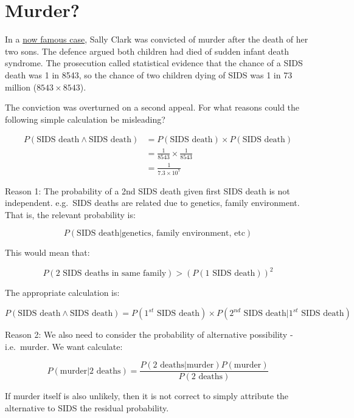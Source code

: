 \documentclass[
  letterpaper,
  DIV=11,
  numbers=noendperiod]{scrreprt}
\begin{document}
\hypertarget{murder}{%
\section{Murder?}\label{murder}}

In a \href{https://en.wikipedia.org/wiki/Sally_Clark}{now famous case},
Sally Clark was convicted of murder after the death of her two sons. The
defence argued both children had died of sudden infant death syndrome.
The prosecution called statistical evidence that the chance of a SIDS
death was 1 in 8543, so the chance of two children dying of SIDS was 1
in 73 million (\(8543\times 8543\)).

The conviction was overturned on a second appeal. For what reasons could
the following simple calculation be misleading?

\begin{align*}
P(\text{SIDS death}\land\text{SIDS death})&=P(\text{SIDS death})\times P(\text{SIDS death}) \\
&=\frac{1}{8543}\times\frac{1}{8543} \\
&=\frac{1}{\ensuremath{7.3\times 10^{7}}}
\end{align*}

\begin{tcolorbox}[enhanced jigsaw, title=\textcolor{quarto-callout-tip-color}{\faLightbulb}\hspace{0.5em}{Answer}, toprule=.15mm, colback=white, breakable, titlerule=0mm, colframe=quarto-callout-tip-color-frame, coltitle=black, opacityback=0, rightrule=.15mm, colbacktitle=quarto-callout-tip-color!10!white, bottomtitle=1mm, opacitybacktitle=0.6, arc=.35mm, bottomrule=.15mm, toptitle=1mm, leftrule=.75mm, left=2mm]

Reason 1: The probability of a 2nd SIDS death given first SIDS death is
not independent. e.g.~SIDS deaths are related due to genetics, family
environment. That is, the relevant probability is:

\[
P(\text{SIDS death}|\text{genetics, family environment, etc})
\]

This would mean that:

\[
P(\text{2 SIDS deaths in same family})>(P(\text{1 SIDS death}))^2
\]

The appropriate calculation is:

\[
P(\text{SIDS death}\land\text{SIDS death})=P(1^{st}\text{ SIDS death})\times P(2^{nd}\text{ SIDS death}|1^{st}\text{ SIDS death})
\]

Reason 2: We also need to consider the probability of alternative
possibility - i.e.~murder. We want calculate:

\[
P(\text{murder}|{2\text{ deaths}})=\frac{P(2\text{ deaths}|\text{murder})P(\text{murder})}{P(2\text{ deaths})}
\]

If murder itself is also unlikely, then it is not correct to simply
attribute the alternative to SIDS the residual probability.

\end{tcolorbox}
\end{document}
